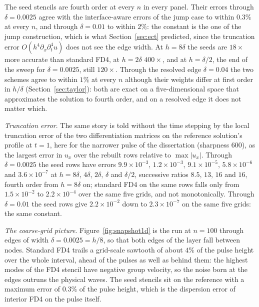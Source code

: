 \documentclass[11pt]{amsart}
\theoremstyle{definition}
\theoremstyle{remark}
\newcommand{\px}{\partial_x}
\newcommand{\pt}{\partial_t}
\newcommand{\para}[1]{\par\smallskip\noindent\textit{#1}.\enspace}
\begin{document}
The seed stencils are fourth order at every $n$ in every panel. Their
errors through $\delta = 0.0025$ agree with the interface-aware errors of
the jump case to within $0.3\%$ at every $n$, and through $\delta = 0.01$
to within $2\%$: the constant is the one of the jump construction, which
is what Section~\ref{sec:ect} predicted, since the truncation error
$O(h^4 \px \pt^4 u)$ does not see the edge width. At $h = 8\delta$ the
seeds are $18\times$ more accurate than standard FD4, at $h = 2\delta$
$400\times$, and at $h = \delta / 2$, the end of the sweep for
$\delta = 0.0025$, still $120\times$. Through the resolved edge $\delta =
0.04$ the two schemes agree to within $1\%$ at every $n$ although their
weights differ at first order in $h / \delta$ (Section~\ref{sec:taylor}):
both are exact on a five-dimensional space that approximates the
solution to fourth order, and on a resolved edge it does not matter which.

\para{Truncation error}
The same story is told without the time stepping by the local truncation
error of the two differentiation matrices on the reference solution's
profile at $t = 1$, here for the narrower pulse of the dissertation
(sharpness $600$), as the largest error in $u_x$ over the rebuilt rows
relative to $\max |u_x|$. Through $\delta = 0.0025$ the seed rows have
errors $9.9 \times 10^{-3}$, $1.2 \times 10^{-3}$, $9.1 \times 10^{-5}$,
$5.8 \times 10^{-6}$ and $3.6 \times 10^{-7}$ at $h = 8\delta$, $4\delta$,
$2\delta$, $\delta$ and $\delta / 2$, successive ratios $8.5$, $13$, $16$
and $16$, fourth order from $h = 8\delta$ on; standard FD4 on the same
rows falls only from $1.5 \times 10^{-2}$ to $2.2 \times 10^{-4}$ over
the same five grids, and not monotonically. Through
$\delta = 0.01$ the seed rows give $2.2 \times 10^{-2}$ down to $2.3
\times 10^{-7}$ on the same five grids: the same constant.

\para{The coarse-grid picture}
Figure~\ref{fig:snapshot1d} is the run at $n = 100$ through edges of
width $\delta = 0.0025 = h / 8$, so that both edges of the layer fall
between nodes. Standard FD4 trails a grid-scale sawtooth of about $4\%$
of the pulse height over the whole interval, ahead of the pulses as well
as behind them: the highest modes of the FD4 stencil have negative group
velocity, so the noise born at the edges outruns the physical waves. The
seed stencils sit on the reference with a maximum error of $0.3\%$ of
the pulse height, which is the dispersion error of interior FD4 on the
pulse itself.
\end{document}
